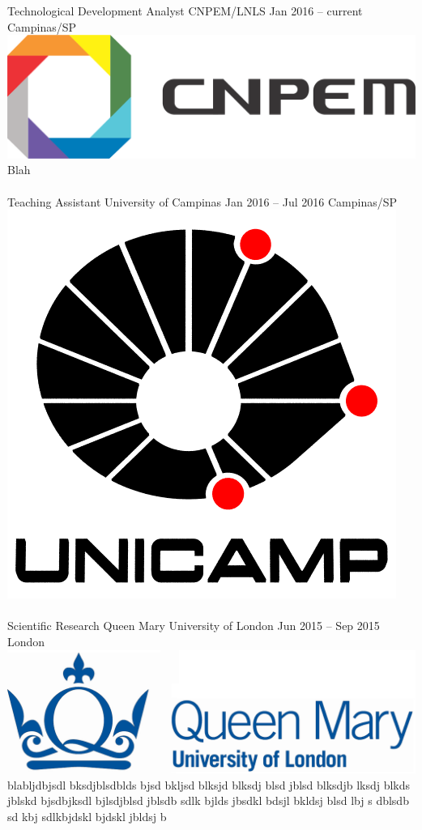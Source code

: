 \documentclass[
	a4paper,
]{fortysecondscv}
\newcommand{\profiledivider}{\textcolor{body!30}{\hdashrule{\linewidth}{0.6pt}{0.5ex}}\\}
\begin{document}
\graphicspath{{../figures/work/}}
    \cvevent
        {Technological Development Analyst}
        {CNPEM/LNLS}
        {Jan 2016 -- current}
        {Campinas/SP}
        {\hspace{2mm}\includegraphics[height=0.07\textwidth]{CNPEM}}
        {Blah}
    \\\profiledivider
    \cvevent
        {Teaching Assistant}
        {University of Campinas}
        {Jan 2016 -- Jul 2016}
        {Campinas/SP}
        {\hspace{2mm}\includegraphics[height=0.07\textwidth]{Unicamp}}
        {\blindtext}
    \\\profiledivider
    \cvevent
        {Scientific Research}
        {Queen Mary University of London}
        {Jun 2015 -- Sep 2015}
        {London}
        {\hspace{2mm}\includegraphics[height=0.07\textwidth]{QMUL}}
        {blabljdbjsdl bksdjblsdblds bjsd bkljsd blksjd blksdj blsd jblsd blksdjb lksdj blkds jblskd bjsdbjksdl bjlsdjblsd jblsdb sdlk bjlds jbsdkl bdsjl bkldsj blsd lbj s dblsdb sd kbj sdlkbjdskl bjdskl jbldsj b}
    \\\profiledivider
\end{document}
